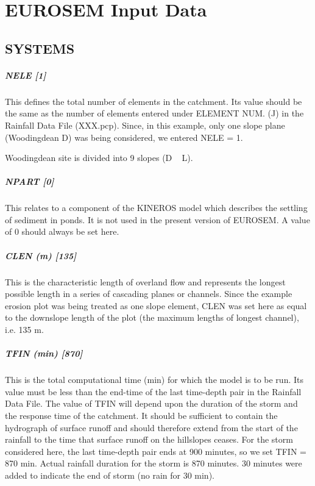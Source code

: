\chapter{EUROSEM Input Data}
\label{sec:EUROSEMInputData}

\section{SYSTEMS}
\label{sec:SYSTEMS}

\paragraph{NELE [1]}
This defines the total number of elements in the catchment. Its value should be the same as the number of elements entered under ELEMENT NUM. (J) in the Rainfall Data File (XXX.pcp). Since, in this example, only one slope plane (Woodingdean D) was being considered, we entered NELE = 1.
 
Woodingdean site is divided into 9 slopes (D ~ L).
 
\paragraph{NPART [0]}
This relates to a component of the KINEROS model which describes the settling of sediment in ponds. It is not used in the present version of EUROSEM. A value of 0 should always be set here.
 
\paragraph{CLEN (m) [135]}
This is the characteristic length of overland flow and represents the longest possible length in a series of cascading planes or channels. Since the example erosion plot was being treated as one slope element, CLEN was set here as equal to the downslope length of the plot (the maximum lengths of longest channel), i.e. 135 m.
 
\paragraph{TFIN (min) [870]}
This is the total computational time (min) for which the model is to be run. Its value must be less than the end-time of the last time-depth pair in the Rainfall Data File. The value of TFIN will depend upon the duration of the storm and the response time of the catchment. It should be sufficient to contain the hydrograph of surface runoff and should therefore extend from the start of the rainfall to the time that surface runoff on the hillslopes ceases. For the storm considered here, the last time-depth pair ends at 900 minutes, so we set TFIN = 870 min. Actual rainfall duration for the storm is 870 minutes. 30 minutes were added to indicate the end of storm (no rain for 30 min).
 

